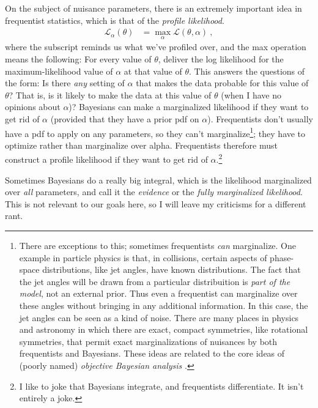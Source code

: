 \documentclass{article}
\begin{document}
On the subject of nuisance parameters,
there is an extremely important idea in frequentist statistics, which is that of the \emph{profile likelihood}.
\begin{align}
    \mathscr{L}_\alpha(\theta) &= \max_\alpha \mathscr{L}(\theta,\alpha) ~,
\end{align}
where the subscript reminds us what we've profiled over, and the max operation means the following:
For every value of $\theta$, deliver the log likelihood for the maximum-likelihood value of $\alpha$ at that value of $\theta$.
This answers the questions of the form:
Is there \emph{any} setting of $\alpha$ that makes the data probable for this value of $\theta$?
That is, is it likely to make the data at this value of $\theta$ (when I have no opinions about $\alpha$)?
Bayesians can make a marginalized likelihood if they want to get rid of $\alpha$ (provided that they have a prior pdf on $\alpha$).
Frequentists don't usually have a pdf to apply on any parameters, so they can't marginalize\footnote{%
There are exceptions to this; sometimes frequentists \emph{can} marginalize.
One example in particle physics is that, in collisions, certain aspects of phase-space distributions, like jet angles, have known distributions.
The fact that the jet angles will be drawn from a particular distribuition is \emph{part of the model}, not an external prior.
Thus even a frequentist can marginalize over these angles without bringing in any additional information.
In this case, the jet angles can be seen as a kind of noise.
There are many places in physics and astronomy in which there are exact, compact symmetries, like rotational symmetries, that permit exact marginalizations of nuisances by both frequentists and Bayesians.
These ideas are related to the core ideas of (poorly named) \emph{objective Bayesian analysis} \cite{objective}.};
they have to optimize rather than marginalize over alpha.
Frequentists therefore must construct a profile likelihood if they want to get rid of $\alpha$.\footnote{%
I like to joke that Bayesians integrate, and frequentists differentiate. It isn't entirely a joke.\label{foot:integrate}}

Sometimes Bayesians do a really big integral, which is the likelihood marginalized over \emph{all} parameters,
and call it the \emph{evidence} or the \emph{fully marginalized likelihood}.
This is not relevant to our goals here, so I will leave my criticisms for a different rant.
\end{document}
